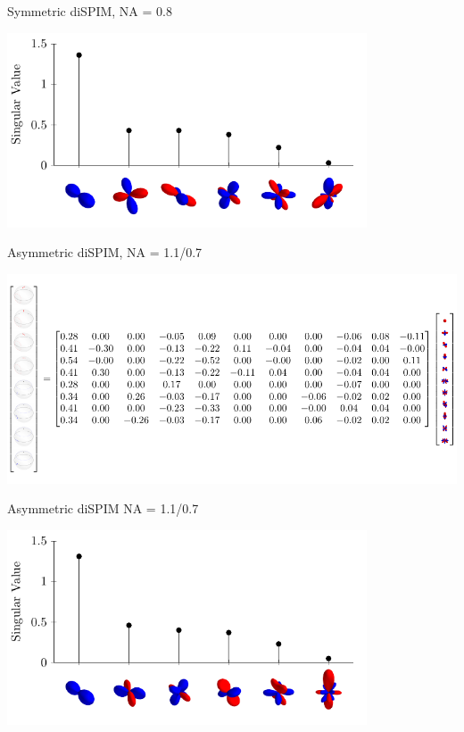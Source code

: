 \documentclass[presentation]{beamer}
\begin{document}
\begin{frame}{Symmetric diSPIM, NA = 0.8}
\begin{center}
  \includegraphics[width=0.8\textwidth, interpolate=true]{figs/svs_dispim}
\end{center}
\end{frame}

\begin{frame}{Asymmetric diSPIM, NA = 1.1/0.7}
\begin{center}
  \includegraphics[width=1.0\textwidth, interpolate=true]{figs/dispim_asymmetric/matrix}
\end{center}
\end{frame}

\begin{frame}{Asymmetric diSPIM NA = 1.1/0.7}
\begin{center}
  \includegraphics[width=0.8\textwidth, interpolate=true]{figs/svs_dispim_asym}
\end{center}
\end{frame}
\end{document}
